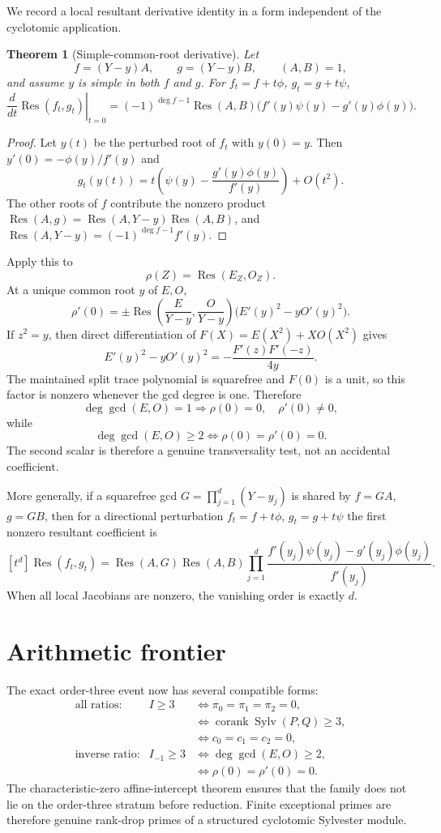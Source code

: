 \documentclass[11pt]{article}
\newtheorem{theorem}{Theorem}[section]
\newcommand{\Res}{\operatorname{Res}}
\begin{document}
We record a local resultant derivative identity in a form independent of the
cyclotomic application.

\begin{theorem}[Simple-common-root derivative]\label{thm:derivative}
Let
\[
f=(Y-y)A,\qquad g=(Y-y)B,
\qquad (A,B)=1,
\]
and assume $y$ is simple in both $f$ and $g$.  For
$f_t=f+t\phi$, $g_t=g+t\psi$,
\[
\left.\frac d{dt}\Res(f_t,g_t)\right|_{t=0}
 =(-1)^{\deg f-1}\Res(A,B)
 \bigl(f'(y)\psi(y)-g'(y)\phi(y)\bigr).
\]
\end{theorem}

\begin{proof}
Let $y(t)$ be the perturbed root of $f_t$ with $y(0)=y$.  Then
$y'(0)=-\phi(y)/f'(y)$ and
\[
g_t(y(t))
 =t\left(\psi(y)-\frac{g'(y)\phi(y)}{f'(y)}\right)+O(t^2).
\]
The other roots of $f$ contribute the nonzero product
$\Res(A,g)=\Res(A,Y-y)\Res(A,B)$, and
$\Res(A,Y-y)=(-1)^{\deg f-1}f'(y)$.
\end{proof}

Apply this to
\[
\rho(Z)=\Res(E_Z,O_Z).
\]
At a unique common root $y$ of $E,O$,
\[
\rho'(0)
 =\pm\Res\!\left(\frac E{Y-y},\frac O{Y-y}\right)
 \bigl(E'(y)^2-yO'(y)^2\bigr).
\]
If $z^2=y$, then direct differentiation of
$F(X)=E(X^2)+XO(X^2)$ gives
\[
E'(y)^2-yO'(y)^2=-\frac{F'(z)F'(-z)}{4y}.
\]
The maintained split trace polynomial is squarefree and $F(0)$ is a unit, so
this factor is nonzero whenever the gcd degree is one.  Therefore
\[
\deg\gcd(E,O)=1
\Longrightarrow
\rho(0)=0,\quad \rho'(0)\ne0,
\]
while
\[
\deg\gcd(E,O)\ge2
\iff
\rho(0)=\rho'(0)=0.
\]
The second scalar is therefore a genuine transversality test, not an accidental
coefficient.

More generally, if a squarefree gcd
$G=\prod_{j=1}^d(Y-y_j)$ is shared by $f=GA$, $g=GB$, then for a directional
perturbation $f_t=f+t\phi$, $g_t=g+t\psi$ the first nonzero resultant
coefficient is
\[
[t^d]\Res(f_t,g_t)
 =\Res(A,G)\Res(A,B)
 \prod_{j=1}^d
 \frac{f'(y_j)\psi(y_j)-g'(y_j)\phi(y_j)}{f'(y_j)}.
\]
When all local Jacobians are nonzero, the vanishing order is exactly $d$.

\section{Arithmetic frontier}

The exact order-three event now has several compatible forms:
\[
\begin{array}{ccl}
\text{all ratios:}
 &I\ge3
 &\iff \pi_0=\pi_1=\pi_2=0,\\[2mm]
 & &\iff \operatorname{corank}\operatorname{Sylv}(P,Q)\ge3,\\[2mm]
 & &\iff c_0=c_1=c_2=0,\\[3mm]
\text{inverse ratio:}
 &I_{-1}\ge3
 &\iff \deg\gcd(E,O)\ge2,\\[2mm]
 & &\iff \rho(0)=\rho'(0)=0.
\end{array}
\]
The characteristic-zero affine-intercept theorem ensures that the family does
not lie on the order-three stratum before reduction.  Finite exceptional primes
are therefore genuine rank-drop primes of a structured cyclotomic Sylvester
module.
\end{document}
